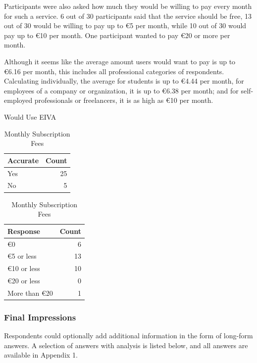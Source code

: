 \documentclass{article}
\begin{document}
Participants were also asked how much they would be willing to pay every month for such a service. 6 out of 30 participants said that the service should be free, 13 out of 30 would be willing to pay up to €5 per month, while 10 out of 30 would pay up to €10 per month. One participant wanted to pay €20 or more per month.

Although it seems like the average amount users would want to pay is up to €6.16 per month, this includes all professional categories of respondents. Calculating individually, the average for students is up to €4.44 per month, for employees of a company or organization, it is up to €6.38 per month; and for self-employed professionals or freelancers, it is as high as €10 per month.

\begin{table}[!htb]
	\begin{minipage}{.5\linewidth}
		\caption{Would Use EIVA}
		\centering
		\begin{tabular}{lr}
			\hline
			\textbf{Accurate} & \textbf{Count} \\
			\hline
			Yes               & 25             \\
			No                & 5              \\
			\hline
		\end{tabular}
	\end{minipage}%
	\hspace{.1cm}
	\begin{minipage}{.5\linewidth}
		\centering
		\caption{Monthly Subscription Fees}
		\begin{tabular}{lr}
			\hline
			\textbf{Response} & \textbf{Count} \\
			\hline
			€0              & 6              \\
			€5 or less      & 13             \\
			€10 or less     & 10             \\
			€20 or less     & 0              \\
			More than €20   & 1              \\
			\hline
		\end{tabular}
	\end{minipage}
\end{table}

\subsubsection{Final Impressions}

Respondents could optionally add additional information in the form of long-form answers. A selection of answers with analysis is listed below, and all answers are available in Appendix 1.
\end{document}
